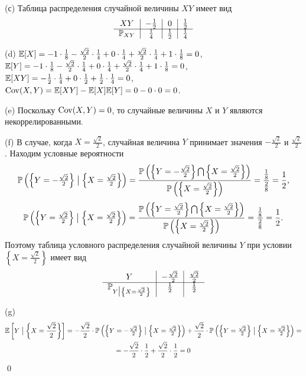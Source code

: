 \documentclass[12pt, a4paper]{article}\usepackage[]{graphicx}\usepackage[]{color}
\begin{document}
\begin{enumerate}
(с) Таблица распределения случайной величины $XY$ имеет вид
\[
\begin{tabular}{c|c|c|c}
  $XY$               & $-\frac{1}{2}$     & $0$             & $\frac{1}{2}$  \\ \cline{1-4}
  $\P_{XY}$  & $\frac{1}{4}$      & $\frac{1}{2}$   & $\frac{1}{4}$  \\
\end{tabular}
\]

(d) $\E[X] = -1 \cdot \frac{1}{8} - \frac{\sqrt{2}}{2} \cdot \frac{1}{4} + 0 \cdot \frac{1}{4} + \frac{\sqrt{2}}{2} \cdot \frac{1}{4} + 1 \cdot \frac{1}{8} = 0$,
$\E[Y] = -1 \cdot \frac{1}{8} - \frac{\sqrt{2}}{2} \cdot \frac{1}{4} + 0 \cdot \frac{1}{4} + \frac{\sqrt{2}}{2} \cdot \frac{1}{4} + 1 \cdot \frac{1}{8} = 0$,
$\E[XY] = -\frac{1}{2} \cdot \frac{1}{4} + 0 \cdot \frac{1}{2} + \frac{1}{2} \cdot \frac{1}{4} = 0$,
$\Cov(X,Y) = \E[XY] - \E[X]\E[Y] = 0 - 0 \cdot 0 = 0$.

(e) Поскольку $\Cov(X,Y) = 0$, то случайные величины $X$ и $Y$ являются некоррелированными.

(f) В случае, когда $X = \frac{\sqrt{2}}{2}$, случайная величина $Y$ принимает значения $-\frac{\sqrt{2}}{2}$ и $\frac{\sqrt{2}}{2}$. Находим условные вероятности
\[
\P\left(\left\{Y=-\tfrac{\sqrt{2}}{2}\right\} \bigm| \left\{X = \tfrac{\sqrt{2}}{2}\right\}\right) =
\frac{\P\left(\left\{Y=-\tfrac{\sqrt{2}}{2}\right\} \bigcap \left\{X = \tfrac{\sqrt{2}}{2}\right\}\right)}{\P\left(\left\{X = \tfrac{\sqrt{2}}{2}\right\}\right)} = \frac{\tfrac{1}{8}}{\tfrac{2}{8}} = \frac{1}{2} \text{,}
\]
\[
\P\left(\left\{Y=\tfrac{\sqrt{2}}{2}\right\} \bigm| \left\{X = \tfrac{\sqrt{2}}{2}\right\}\right) =
\frac{\P\left(\left\{Y=\tfrac{\sqrt{2}}{2}\right\} \bigcap \left\{X = \tfrac{\sqrt{2}}{2}\right\}\right)}{\P\left(\left\{X = \tfrac{\sqrt{2}}{2}\right\}\right)} = \frac{\tfrac{1}{8}}{\tfrac{2}{8}} = \frac{1}{2} \text{.}
\]
Поэтому таблица условного распределения случайной величины $Y$ при условии $\left\{X = \frac{\sqrt{2}}{2}\right\}$ имеет вид
\[
\begin{tabular}{c|c|c}
  $Y$                                                             & $-\frac{\sqrt{2}}{2}$     & $\frac{\sqrt{2}}{2}$    \\ \cline{1-3}
  $\P_{Y\bigm|\left\{X = \frac{\sqrt{2}}{2}\right\}}$     & $\frac{1}{2}$             & $\frac{1}{2}$           \\
\end{tabular}
\]

(g)
\begin{multline}
\E\left[Y\bigm|\left\{X = \frac{\sqrt{2}}{2}\right\}\right] = -\frac{\sqrt{2}}{2} \cdot \P\left(\left\{Y=-\tfrac{\sqrt{2}}{2}\right\} \bigm| \left\{X = \tfrac{\sqrt{2}}{2}\right\}\right) + \frac{\sqrt{2}}{2} \cdot \P\left(\left\{Y=\tfrac{\sqrt{2}}{2}\right\} \bigm| \left\{X = \tfrac{\sqrt{2}}{2}\right\}\right) = \\
 = -\frac{\sqrt{2}}{2} \cdot \frac{1}{2} + \frac{\sqrt{2}}{2} \cdot \frac{1}{2} = 0
\end{multline}
\qed


\end{enumerate}
\end{document}
